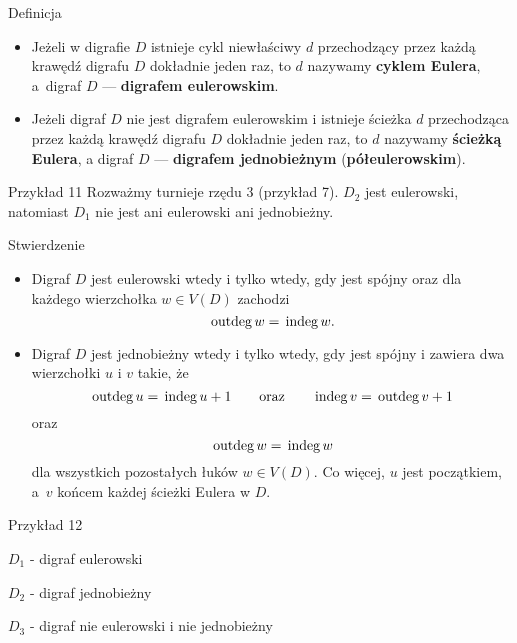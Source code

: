 \documentclass[a4paper,10pt]{beamer}
\newcommand{\outdeg}{{\,\rm{outdeg}\,}}
\newcommand{\indeg}{{\,\rm{indeg}\,}}
\begin{document}
\begin{frame}

\begin{block}{Definicja}
\begin{itemize}
	\item	Jeżeli w digrafie $D$ istnieje cykl niewłaściwy $d$ przechodzący przez każdą krawędź digrafu $D$ dokładnie jeden raz, to $d$ nazywamy {\bf cyklem Eulera}, a~digraf $D$ --- {\bf digrafem eulerowskim}.
	\item Jeżeli digraf $D$ nie jest digrafem eulerowskim i istnieje ścieżka $d$ przechodząca przez każdą krawędź digrafu $D$ dokładnie jeden raz, to $d$ nazywamy {\bf ścieżką Eulera}, a digraf $D$ --- {\bf digrafem jednobieżnym} ({\bf półeulerowskim}).
\end{itemize}
\end{block}

\begin{exampleblock}{Przykład 11}
Rozważmy turnieje rzędu $3$ (przykład 7). $D_2$ jest eulerowski, natomiast $D_1$ nie jest ani eulerowski ani jednobieżny.%
\end{exampleblock}

\end{frame}


\begin{frame}

\begin{block}{Stwierdzenie}
\begin{itemize}
	\item Digraf $D$ jest eulerowski wtedy i tylko wtedy, gdy jest spójny oraz dla każdego wierzchołka $w\in V(D)$ zachodzi
$$\outdeg w=\indeg w.$$
	\item Digraf $D$ jest jednobieżny wtedy i tylko wtedy, gdy jest spójny i zawiera dwa wierzchołki $u$ i $v$ takie, że
$$\outdeg u=\indeg u+1\ \ \ \ \ \mbox{ oraz }\ \ \ \ \ \indeg v =\outdeg v+1$$
oraz $$\outdeg w =\indeg w $$ dla wszystkich pozostałych łuków $w\in V(D)$.  Co więcej, $u$ jest początkiem, a~$v$ końcem każdej ścieżki Eulera w $D$. 
\end{itemize}
\end{block}

\end{frame}



\begin{frame}

\begin{exampleblock}{Przykład 12}



$D_1$ - digraf eulerowski

$D_2$ - digraf jednobieżny

$D_3$ - digraf nie eulerowski i nie jednobieżny

\end{exampleblock}

\end{frame}
\end{document}
